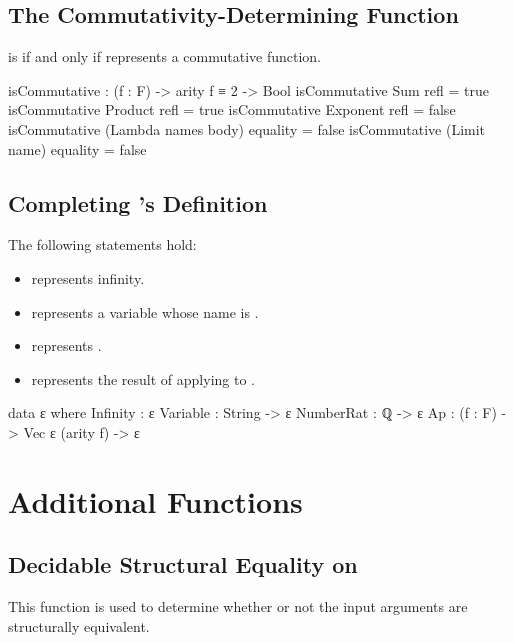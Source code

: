 \documentclass{report}
\begin{document}
\subsection{The Commutativity-Determining Function}
   is  if and only if  represents a commutative function.

\begin{code}
isCommutative : (f : F) -> arity f ≡ 2 -> Bool
isCommutative Sum refl = true
isCommutative Product refl = true
isCommutative Exponent refl = false
isCommutative (Lambda names body) equality = false
isCommutative (Limit name) equality = false
\end{code}

\subsection{Completing 's Definition}
The following statements hold:

\begin{itemize}
  \item {} represents infinity.
  \item {}  represents a variable whose name is .
  \item {}  represents .
  \item {}   represents the result of applying  to .
\end{itemize}

\begin{code}
data ε where
  Infinity : ε
  Variable : String -> ε
  NumberRat : ℚ -> ε
  Ap : (f : F) -> Vec ε (arity f) -> ε
\end{code}

\section{Additional Functions}

\subsection{Decidable Structural Equality on }
This function is used to determine whether or not the input arguments are structurally equivalent.
\end{document}
